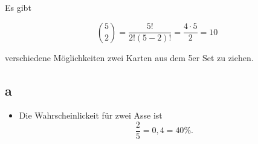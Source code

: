 \documentclass[12pt]{article}
\begin{document}
Es gibt 

\begin{equation}
\binom{5}{2} = \frac{5!}{2!(5-2)!} = \frac{ 4 \cdot 5}{2} = 10
\end{equation}

verschiedene Möglichkeiten zwei Karten aus dem 5er Set zu ziehen.

\subsection{a}
\begin{itemize}
    \item Die Wahrscheinlickeit für zwei Asse ist
    \begin{equation}
    \frac{2}{5} = 0,4 = 40\%.
    \end{equation}

\end{itemize}
\end{document}
